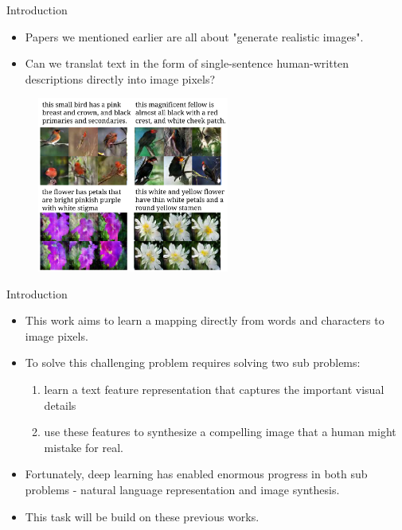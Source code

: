 \documentclass[10pt]{beamer}
\begin{document}
	\begin{frame}{Introduction}
		\begin{itemize}
			\item Papers we mentioned earlier are all about "generate realistic images".
			\onslide<2->
			\item Can we translat text in the form of single-sentence human-written descriptions directly into image pixels?
		\end{itemize}
		\begin{figure}
			\includegraphics<3->[width=17em]{figures/image-synthesis-prelude-demo.png}
		\end{figure}
	\end{frame}

	\begin{frame}{Introduction}
		\begin{itemize}
			\item This work aims to learn a mapping directly from words and characters to image pixels.
			\pause
			\item To solve this challenging problem requires solving two sub problems:
			\begin{enumerate}
				\pause
				\item learn a text feature representation that captures the important visual details
				\pause
				\item use these features to synthesize a compelling image that a human might mistake for real.
			\end{enumerate}
			\pause
			\item Fortunately, deep learning has enabled enormous progress in both sub problems - natural language representation and image synthesis.
			\pause
			\item This task will be build on these previous works.
		\end{itemize}
	\end{frame}
\end{document}
